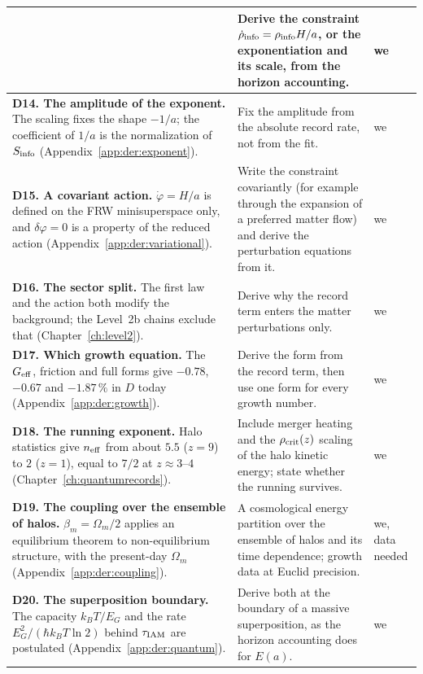 {\begin{longtable}{@{}>{\raggedright\arraybackslash}p{}>{\raggedright\arraybackslash}p{}>{\raggedright\arraybackslash}p{}@{}}
 & Derive the constraint $\dot\rho_{\rm info}=\rho_{\rm info}H/a$, or the exponentiation and its scale, from the horizon accounting. & we \\\cmidrule[0.2pt]{1-3}
\textbf{D14. The amplitude of the exponent.} The scaling fixes the shape $-1/a$; the coefficient of $1/a$ is the normalization of $S_{\rm info}$
 (Appendix~\ref{app:der:exponent}). & Fix the amplitude from the absolute record rate, not from the fit. & we \\\cmidrule[0.2pt]{1-3}
\textbf{D15. A covariant action.} $\dot\varphi=H/a$ is defined on the FRW minisuperspace only, and $\delta\varphi=0$ is a property of the reduced
 action (Appendix~\ref{app:der:variational}). & Write the constraint covariantly (for example through the expansion of a preferred matter flow) and
 derive the perturbation equations from it. & we \\\cmidrule[0.2pt]{1-3}
\textbf{D16. The sector split.} The first law and the action both modify the background; the Level~2b chains exclude that (Chapter~\ref{ch:level2}).
 & Derive why the record term enters the matter perturbations only. & we \\\cmidrule[0.2pt]{1-3}
\textbf{D17. Which growth equation.} The $G_{\rm eff}$, friction and full forms give $-0.78$, $-0.67$ and $-1.87\,\%$ in $D$ today
 (Appendix~\ref{app:der:growth}). & Derive the form from the record term, then use one form for every growth number. & we \\\cmidrule[0.2pt]{1-3}
\textbf{D18. The running exponent.} Halo statistics give $n_{\rm eff}$ from about $5.5$ ($z=9$) to $2$ ($z=1$), equal to $7/2$ at $z\approx3$--$4$
 (Chapter~\ref{ch:quantumrecords}). & Include merger heating and the $\rho_{\rm crit}(z)$ scaling of the halo kinetic energy; state whether the running
 survives. & we \\\cmidrule[0.2pt]{1-3}
\textbf{D19. The coupling over the ensemble of halos.} $\beta_m=\Omega_m/2$ applies an equilibrium theorem to non-equilibrium structure, with the
 present-day $\Omega_m$ (Appendix~\ref{app:der:coupling}). & A cosmological energy partition over the ensemble of halos and its time dependence;
 growth data at Euclid precision. & we, data needed \\\cmidrule[0.2pt]{1-3}
\textbf{D20. The superposition boundary.} The capacity $k_BT/E_G$ and the rate $E_G^2/(\hbar k_BT\ln2)$ behind $\tau_{\rm IAM}$ are postulated
 (Appendix~\ref{app:der:quantum}). & Derive both at the boundary of a massive superposition, as the horizon accounting does for $E(a)$. & we \\
\bottomrule
\end{longtable}}

